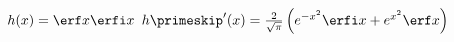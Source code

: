 {$h(x) =\erf x \erfi x$
}
{$h\primeskip'(x) = \frac{2}{\sqrt{\pi}}\left(e^{-x^2} \erfi x + e^{x^2} \erf x \right)$
}
